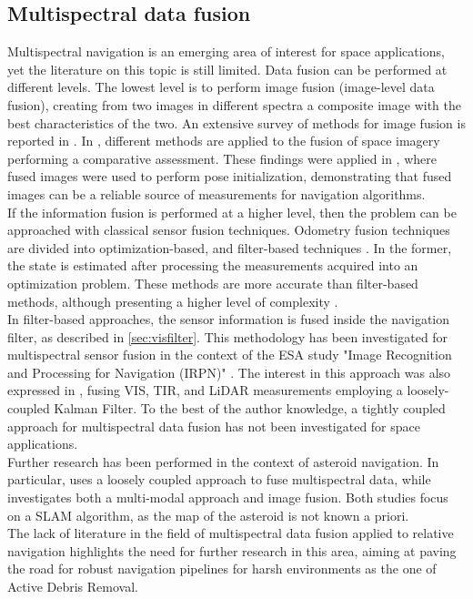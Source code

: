 \subsection{Multispectral data fusion}
Multispectral navigation is an emerging area of interest for space applications, yet the literature on this topic is still limited. Data fusion can be performed at different levels. The lowest level is to perform image fusion (image-level data fusion), creating from two images in different spectra a composite image with the best characteristics of the two. An extensive survey of methods for image fusion is reported in \cite{singh2021review}. 
In \cite{civardi2022vis}, different methods are applied to the fusion of space imagery performing a comparative assessment. These findings were applied in \cite{bechini2022robust}, where fused images were used to perform pose initialization, demonstrating that fused images can be a reliable source of measurements for navigation algorithms. \\
If the information fusion is performed at a higher level, then the problem can be approached with classical sensor fusion techniques. Odometry fusion techniques are divided into optimization-based, and filter-based techniques \cite{yang2022sensors}. In the former, the state is estimated after processing the measurements acquired into an optimization problem. These methods are more accurate than filter-based methods, although presenting a higher level of complexity \cite{jia2021lvio}. \\
In filter-based approaches, the sensor information is fused inside the navigation filter, as described in \cref{sec:visfilter}. This methodology has been investigated for multispectral sensor fusion in the context of the ESA study "Image Recognition and Processing for Navigation (IRPN)" \cite{sonnenburg2016image}. The interest in this approach was also expressed in \cite{galante2016fast}, fusing VIS, TIR, and LiDAR measurements employing a loosely-coupled Kalman Filter. To the best of the author knowledge, a tightly coupled approach for multispectral data fusion has not been investigated for space applications.\\ 
Further research has been performed in the context of asteroid navigation. In particular, \cite{civardi2021small} uses a loosely coupled approach to fuse multispectral data, while \cite{piccinin2023spacecraft} investigates both a multi-modal approach and image fusion. Both studies focus on a SLAM algorithm, as the map of the asteroid is not known a priori.\\
The lack of literature in the field of multispectral data fusion applied to relative navigation highlights the need for further research in this area, aiming at paving the road for robust navigation pipelines for harsh environments as the one of Active Debris Removal.  

